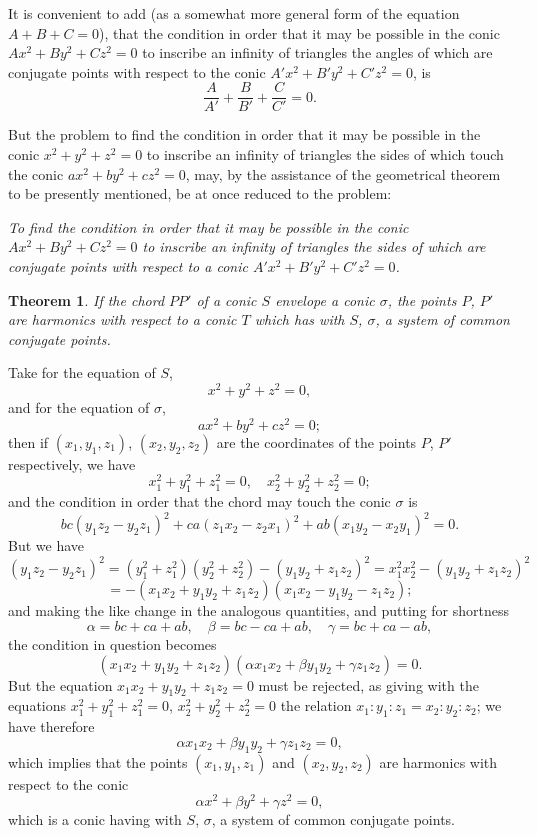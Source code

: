 \documentclass[11pt,a4paper]{book}
\newtheorem*{theorem}{Theorem}
\begin{document}
{{It is convenient to add (as a somewhat more general form of the equation $A+B+C=0$), that the condition in order that it may be possible in the conic $Ax^2 + By^2 + Cz^2 = 0$ to inscribe an infinity of triangles the angles of which are conjugate points with respect to the conic $A'x^2 + B'y^2 + C'z^2 = 0$, is
\[
\frac{A}{A'} + \frac{B}{B'} + \frac{C}{C'} = 0.
\]

But the problem to find the condition in order that it may be possible in the conic $x^2 + y^2 + z^2 = 0$ to inscribe an infinity of triangles the sides of which touch the conic $ax^2 + by^2 + cz^2 = 0$, may, by the assistance of the geometrical theorem to be presently mentioned, be at once reduced to the problem:

\textit{To find the condition in order that it may be possible in the conic $Ax^2 + By^2 + Cz^2 = 0$ to inscribe an infinity of triangles the sides of which are conjugate points with respect to a conic $A'x^2 + B'y^2 + C'z^2 = 0$.}

\begin{theorem}
If the chord $PP'$ of a conic $S$ envelope a conic $\sigma$, the points $P$, $P'$ are harmonics with respect to a conic $T$ which has with $S$, $\sigma$, a system of common conjugate points.
\end{theorem}

Take for the equation of $S$,
\[
x^2 + y^2 + z^2 = 0,
\]
and for the equation of $\sigma$,
\[
ax^2 + by^2 + cz^2 = 0;
\]
then if $(x_1, y_1, z_1)$, $(x_2, y_2, z_2)$ are the coordinates of the points $P$, $P'$ respectively, we have
\[
x_1^2 + y_1^2 + z_1^2 = 0, \quad x_2^2 + y_2^2 + z_2^2 = 0;
\]
and the condition in order that the chord may touch the conic $\sigma$ is
\[
bc(y_1z_2 - y_2z_1)^2 + ca(z_1x_2 - z_2x_1)^2 + ab(x_1y_2 - x_2y_1)^2 = 0.
\]
But we have
\[
(y_1z_2 - y_2z_1)^2 = (y_1^2 + z_1^2)(y_2^2 + z_2^2) - (y_1y_2 + z_1z_2)^2 = x_1^2x_2^2 - (y_1y_2 + z_1z_2)^2
\]
\[
= -(x_1x_2 + y_1y_2 + z_1z_2)(x_1x_2 - y_1y_2 - z_1z_2);
\]
and making the like change in the analogous quantities, and putting for shortness
\[
\alpha = bc + ca + ab, \quad \beta = bc - ca + ab, \quad \gamma = bc + ca - ab,
\]
the condition in question becomes
\[
(x_1x_2 + y_1y_2 + z_1z_2)(\alpha x_1x_2 + \beta y_1y_2 + \gamma z_1z_2) = 0.
\]
But the equation $x_1x_2 + y_1y_2 + z_1z_2 = 0$ must be rejected, as giving with the equations $x_1^2 + y_1^2 + z_1^2 = 0$, $x_2^2 + y_2^2 + z_2^2 = 0$ the relation $x_1:y_1:z_1 = x_2:y_2:z_2$; we have therefore
\[
\alpha x_1x_2 + \beta y_1y_2 + \gamma z_1z_2 = 0,
\]
which implies that the points $(x_1, y_1, z_1)$ and $(x_2, y_2, z_2)$ are harmonics with respect to the conic
\[
\alpha x^2 + \beta y^2 + \gamma z^2 = 0,
\]
which is a conic having with $S$, $\sigma$, a system of common conjugate points.

}}
\end{document}

